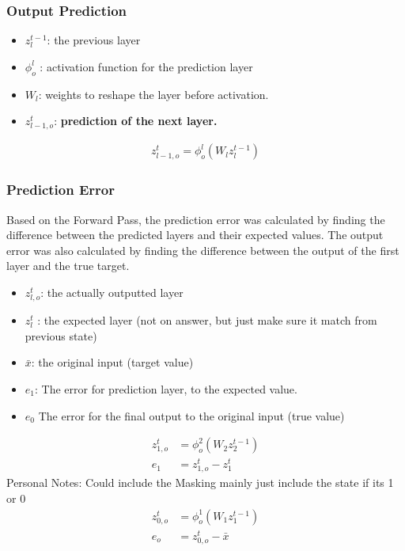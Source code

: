 \documentclass{article}
\begin{document}
\subsubsection{Output Prediction}
\begin{itemize}
    \item $z_l^{t-1}$: the previous layer 
    \item $\phi_{o}^l$ : activation function for the prediction layer
    \item $W_l$: weights to reshape the layer before activation. 
    \item $z_{l-1,o}^t$: \textbf{prediction of the next layer. }
\end{itemize}
\begin{align}
z_{l-1,o}^t = \phi_{o}^l(W_lz_l^{t-1})
\end{align}

\subsubsection{Prediction Error}
Based on the Forward Pass, the prediction error was calculated by finding the difference between the predicted layers and their expected values. The output error was also calculated by finding the difference between the output of the first layer and the true target.
\begin{itemize}
    \item $z_{l,o}^t$: the actually outputted layer
    \item $z_l^t$ : the expected layer (not on answer, but just make sure it match from previous state)
    \item $\bar{x}$: the original input (target value)
    \item $e_1$: The error for prediction layer, to the expected value. 
    \item $e_0$ The error for the final output to the original input (true value)
\end{itemize}
\begin{align}
 z_{1,o}^t &= \phi_{o}^2(W_2z_2^{t-1}) \\
 e_1 &= z_{1,o}^t - z_1^t      %
 \end {align}
Personal Notes: Could include the Masking mainly just include the state if its 1 or 0 
\begin{align}
z_{0,o}^t &= \phi_{o}^1(W_1z_1^{t-1}) \\
 e_o &= z_{0,o}^t - \bar{x}    %
\end {align}
\end{document}
